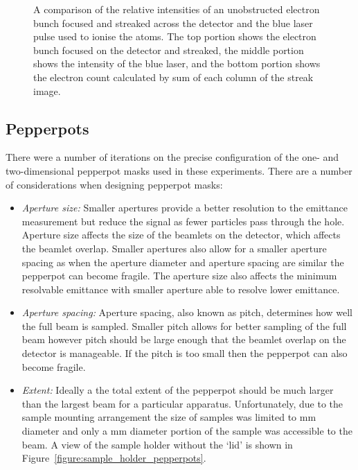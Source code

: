 \begin{figure}
    \center
    
    \caption{A comparison of the relative intensities of an unobstructed electron bunch focused and streaked across the detector and the blue laser pulse used to ionise the atoms.
    The top portion shows the electron bunch focused on the detector and streaked, the middle portion shows the intensity of the blue laser, and the bottom portion shows the electron count calculated by sum of each column of the streak image.}
    \label{figure:blue_streak}
\end{figure}

\subsection{Pepperpots}
There were a number of iterations on the precise configuration of the one- and two-dimensional pepperpot masks used in these experiments.
There are a number of considerations when designing pepperpot masks:
\begin{itemize}
    \item{\emph{Aperture size:} Smaller apertures provide a better resolution to the emittance measurement but reduce the signal as fewer particles pass through the hole.
    Aperture size affects the size of the beamlets on the detector, which affects the beamlet overlap. Smaller apertures also allow for a smaller aperture spacing as when the aperture diameter and aperture spacing are similar the pepperpot can become fragile. The aperture size also affects the minimum resolvable emittance with smaller aperture able to resolve lower emittance.}
    \item{\emph{Aperture spacing:} Aperture spacing, also known as pitch, determines how well the full beam is sampled.
    Smaller pitch allows for better sampling of the full beam however pitch should be large enough that the beamlet overlap on the detector is manageable.
    If the pitch is too small then the pepperpot can also become fragile.}
    \item{\emph{Extent:} Ideally a the total extent of the pepperpot should be much larger than the largest beam for a particular apparatus.
    Unfortunately, due to the sample mounting arrangement the size of samples was limited to \unit[3]{mm} diameter and only a \unit[2]{mm} diameter portion of the sample was accessible to the beam. A view of the sample holder without the `lid' is shown in Figure~\ref{figure:sample_holder_pepperpots}.}
\end{itemize}

